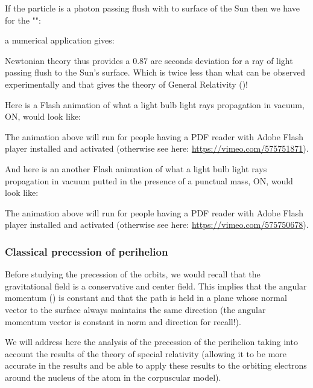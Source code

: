 	If the particle is a photon passing flush with to surface of the Sun then we have for the "":
	
	a numerical application gives:
	
	Newtonian theory thus provides a $0.87$ arc seconds deviation for a ray of light passing flush to the Sun's surface. Which is twice less than what can be observed experimentally and that gives the theory of General Relativity ()!
	
	Here is a Flash animation of what a light bulb light rays propagation in vacuum, ON, would look like:
	\begin{center}
	\centering
	\end{center}
	The animation above will run for people having a PDF reader with Adobe Flash player installed and activated (otherwise see here: \url{https://vimeo.com/575751871}).
	
	And here is an another Flash animation of what a light bulb light rays propagation in vacuum putted in the presence of a punctual mass, ON, would look like:
	\begin{center}
	\centering
	\end{center}
	The animation above will run for people having a PDF reader with Adobe Flash player installed and activated (otherwise see here: \url{https://vimeo.com/575750678}).
	
	\subsubsection{Classical precession of perihelion}\label{classical precession of perihelion}
	Before studying the precession of the orbits, we would recall that the gravitational field is a conservative and center field. This implies that the angular momentum () is constant and that the path is held in a plane whose normal vector to the surface always maintains the same direction (the angular momentum vector is constant in norm and direction for recall!).

	We will address here the analysis of the precession of the perihelion taking into account the results of the theory of special relativity (allowing it to be more accurate in the results and be able to apply these results to the orbiting electrons around the nucleus of the atom in the corpuscular model).
	
